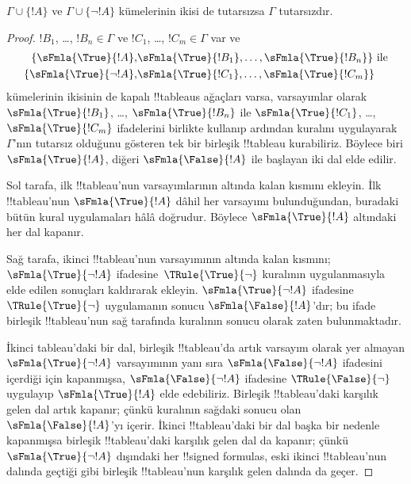 \begin{prop}
  $\Gamma \cup \{!A\}$ ve $\Gamma \cup \{\lnot !A\}$ kümelerinin ikisi de
  tutarsızsa $\Gamma$ tutarsızdır.
\end{prop}

\begin{proof}
  $!B_1$, \dots, $!B_n \in \Gamma$ ve $!C_1$, \dots,
  $!C_m \in \Gamma$ var ve
  \begin{align*}
    \{\sFmla{\True}{!A}, &
    \sFmla{\True}{!B_1}, \dots, \sFmla{\True}{!B_n}\} \text{ ile}\\
    \{\sFmla{\True}{\lnot !A}, &
    \sFmla{\True}{!C_1}, \dots, \sFmla{\True}{!C_m}\}
  \end{align*}
  kümelerinin ikisinin de kapalı !!{tableau}s ağaçları varsa, varsayımlar
  olarak $\sFmla{\True}{!B_1}$, \dots, $\sFmla{\True}{!B_n}$ ile
  $\sFmla{\True}{!C_1}$, \dots, $\sFmla{\True}{!C_m}$ ifadelerini birlikte
  kullanıp ardından \Cut{} kuralını uygulayarak $\Gamma$'nın tutarsız
  olduğunu gösteren tek bir birleşik !!{tableau} kurabiliriz. Böylece biri
  $\sFmla{\True}{!A}$, diğeri $\sFmla{\False}{!A}$ ile başlayan iki dal
  elde edilir.
  
  Sol tarafa, ilk !!{tableau}'nun varsayımlarının altında kalan kısmını
  ekleyin. İlk !!{tableau}'nun $\sFmla{\True}{!A}$ dâhil her varsayımı
  bulunduğundan, buradaki bütün kural uygulamaları hâlâ doğrudur. Böylece
  $\sFmla{\True}{!A}$ altındaki her dal kapanır.
  
  Sağ tarafa, ikinci !!{tableau}'nun varsayımının altında kalan kısmını;
  $\sFmla{\True}{\lnot !A}$ ifadesine~$\TRule{\True}{\lnot}$ kuralının
  uygulanmasıyla elde edilen sonuçları kaldırarak ekleyin.
  $\sFmla{\True}{\lnot !A}$ ifadesine $\TRule{\True}{\lnot}$ uygulamanın
  sonucu $\sFmla{\False}{!A}$'dır; bu ifade birleşik !!{tableau}'nun sağ
  tarafında \Cut{} kuralının sonucu olarak zaten bulunmaktadır.

  İkinci tableau'daki bir dal, birleşik !!{tableau}'da artık varsayım olarak
  yer almayan $\sFmla{\True}{\lnot !A}$ varsayımının yanı sıra
  $\sFmla{\False}{\lnot !A}$ ifadesini içerdiği için kapanmışsa,
  $\sFmla{\False}{\lnot !A}$ ifadesine $\TRule{\False}{\lnot}$ uygulayıp
  $\sFmla{\True}{!A}$ elde edebiliriz. Birleşik !!{tableau}'daki karşılık
  gelen dal artık kapanır; çünkü \Cut{} kuralının sağdaki sonucu olan
  $\sFmla{\False}{!A}$'yı içerir. İkinci !!{tableau}'daki bir dal başka bir
  nedenle kapanmışsa birleşik !!{tableau}'daki karşılık gelen dal da
  kapanır; çünkü $\sFmla{\True}{\lnot !A}$ dışındaki her !!{signed formula}s,
  eski ikinci !!{tableau}'nun dalında geçtiği gibi birleşik !!{tableau}'nun
  karşılık gelen dalında da geçer.
  \end{proof}


